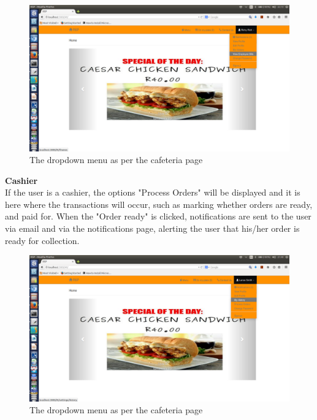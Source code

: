 \documentclass[a4paper,12pt]{report}
\begin{document}
\begin{figure}[H]
  \centering
    \includegraphics[width=1.0\textwidth]{screenshots/financeMenu.png}
    \caption{The dropdown menu as per the cafeteria page} 
\end{figure}

\textbf{Cashier}\\
If the user is a cashier, the options "Process Orders" will be displayed and it is here where the transactions will occur, such as marking whether orders are ready, and paid for. When the "Order ready" is clicked, notifications are sent to the user via email and via the notifications page, alerting the user that his/her order is ready for collection. 
\begin{figure}[H]
  \centering
    \includegraphics[width=1.0\textwidth]{screenshots/cashierMenu.png}
    \caption{The dropdown menu as per the cafeteria page} 
\end{figure}

\end{document}

